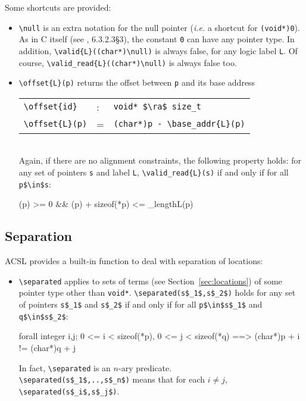 Some shortcuts are provided:
\begin{itemize}
\item \lstinline|\null| is an
  extra notation for the
  null pointer (\emph{i.e.} a shortcut for \lstinline|(void*)0|). 
  As in C itself (see \cite{standardc99}, 6.3.2.3\S3),
  the constant \lstinline|0| can have any pointer type. In addition, 
  \lstinline|\valid{L}((char*)\null)| is always false, for any
  logic label \lstinline|L|.
  Of course, \lstinline|\valid_read{L}((char*)\null)| is always false too.
\item \lstinline|\offset{L}(p)|%
  returns the offset between \lstinline|p| and its base address
\\ \makebox[5mm]{} \begin{tabular}{lll}
    \lstinline|\offset{id}| &:& \lstinline|void* $\ra$ size_t| \\
    \lstinline|\offset{L}(p)| &=& \lstinline|(char*)p - \base_addr{L}(p)| \\
  \end{tabular} \\
Again, if there are no alignment constraints,
  the following property holds: for any set of pointers
\lstinline|s| and label \lstinline|L|, \lstinline|\valid_read{L}(s)| if and only if for all \lstinline|p$\in$s|:
  \begin{listing-nonumber}
    (p) >= 0 && (p) + sizeof(*p) <= \block_length{L}(p)
  \end{listing-nonumber}

\end{itemize}

\subsection{Separation}\label{sec:separated} 

ACSL provides a built-in function to deal with separation of locations:

\begin{itemize}
\item \lstinline|\separated|
applies to sets of terms (see Section~\ref{sec:locations}) of some pointer type
other than \lstinline|void*|. 
\lstinline|\separated(s$_1$,s$_2$)|
holds for any set of pointers \lstinline|s$_1$| and \lstinline|s$_2$| 
if and only if for all \lstinline|p$\in$s$_1$| and \lstinline|q$\in$s$_2$|:
\begin{listing-nonumber}
  forall integer i,j; 0 <= i < sizeof(*p), 0 <= j < sizeof(*q)
     ==>  (char*)p + i != (char*)q + j 
\end{listing-nonumber}

In fact, \lstinline|\separated| is an $n$-ary predicate.\\
\lstinline|\separated(s$_1$,..,s$_n$)| means
that for each
$i\neq j$, \lstinline|\separated(s$_i$,s$_j$)|.
\end{itemize}


